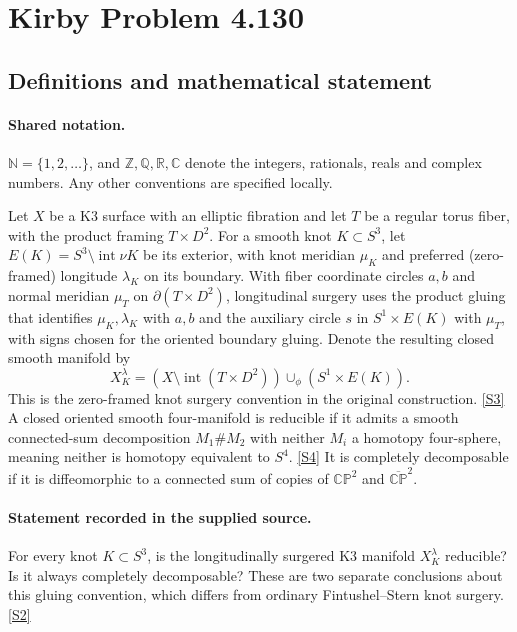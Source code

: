 \documentclass[11pt]{article}
\newcommand{\sref}[2]{\hyperlink{source:#1:#2}{[S#2]}}
\begin{document}
\section{Kirby Problem 4.130}\label{statement}

\subsection{Definitions and mathematical statement}

\paragraph{Shared notation.}$\mathbb N=\{1,2,\ldots\}$, and $\mathbb Z,\mathbb Q,\mathbb R,\mathbb C$ denote the integers, rationals, reals and complex numbers. Any other conventions are specified locally.


Let $X$ be a K3 surface with an elliptic fibration and let $T$ be a regular torus fiber, with the product framing $T\times D^2$. For a smooth knot $K\subset S^3$, let $E(K)=S^3\setminus\operatorname{int}\nu K$ be its exterior, with knot meridian $\mu_K$ and preferred (zero-framed) longitude $\lambda_K$ on its boundary. With fiber coordinate circles $a,b$ and normal meridian $\mu_T$ on $\partial(T\times D^2)$, longitudinal surgery uses the product gluing that identifies $\mu_K,\lambda_K$ with $a,b$ and the auxiliary circle $s$ in $S^1\times E(K)$ with $\mu_T$, with signs chosen for the oriented boundary gluing. Denote the resulting closed smooth manifold by
\[
 X_K^\lambda=(X\setminus\operatorname{int}(T\times D^2))\cup_\phi(S^1\times E(K)).
\]
This is the zero-framed knot surgery convention in the original construction. \sref{statement}{3}
A closed oriented smooth four-manifold is reducible if it admits a smooth connected-sum decomposition $M_1\# M_2$ with neither $M_i$ a homotopy four-sphere, meaning neither is homotopy equivalent to $S^4$. \sref{statement}{4} It is completely decomposable if it is diffeomorphic to a connected sum of copies of $\mathbb{CP}^2$ and $\overline{\mathbb{CP}}^{2}$.
\paragraph{Statement recorded in the supplied source.}
For every knot $K\subset S^3$, is the longitudinally surgered K3 manifold $X_K^\lambda$ reducible? Is it always completely decomposable? These are two separate conclusions about this gluing convention, which differs from ordinary Fintushel--Stern knot surgery. \sref{statement}{2}
\end{document}
